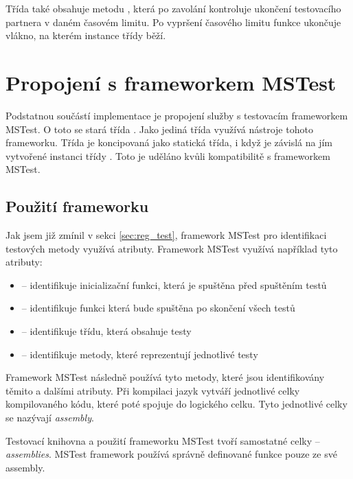 Třída také obsahuje metodu , která po zavolání kontroluje ukončení testovacího partnera v daném časovém limitu. Po vypršení časového limitu funkce ukončuje vlákno, na kterém instance třídy  běží.


\section{Propojení s frameworkem MSTest}

Podstatnou součástí implementace je propojení služby s testovacím frameworkem MSTest. O toto se stará třída . Jako jediná třída využívá nástroje tohoto frameworku. Třída je koncipovaná jako statická třída, i když je závislá na jím vytvořené instanci třídy . Toto je uděláno kvůli kompatibilitě s frameworkem MSTest. 


\subsection{Použití frameworku}
Jak jsem již zmínil v sekci \ref{sec:reg_test}, framework MSTest pro identifikaci testových metody využívá atributy. Framework MSTest využívá například tyto atributy:

\begin{itemize}
    \item {} -- identifikuje inicializační funkci, která je spuštěna před spuštěním testů \cite{attr_init_clean}
    \item {} -- identifikuje funkci která bude spuštěna po skončení všech testů \cite{attr_init_clean}
    \item {} -- identifikuje třídu, která obsahuje testy \cite{mstest_docs}
    \item {} -- identifikuje metody, které reprezentují jednotlivé  testy \cite{mstest_docs}
\end{itemize}

Framework MSTest následně používá tyto metody, které jsou identifikovány těmito a dalšími atributy. Při kompilaci jazyk \csharp{} vytváří jednotlivé celky kompilovaného kódu, které poté spojuje do logického celku. Tyto jednotlivé celky se nazývají \textit{assembly}. \cite{assembly}

Testovací knihovna a použití frameworku MSTest tvoří samostatné celky -- \textit{assemblies}. MSTest framework používá správně definované funkce pouze ze své assembly. 


